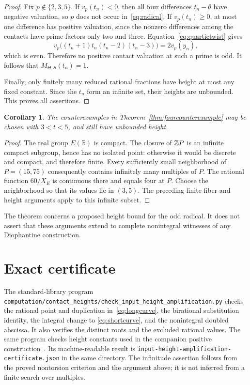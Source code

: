\documentclass[11pt,a4paper]{article}
\newtheorem{corollary}[theorem]{Corollary}
\theoremstyle{definition}\newtheorem{definition}[theorem]{Definition}
\theoremstyle{remark}\newtheorem{remark}[theorem]{Remark}
\newcommand{\R}{\mathbb R}\newcommand{\A}{\mathbb A}
\begin{document}
\begin{proof}
Fix $p\notin\{2,3,5\}$. If $v_p(t_n)<0$, then all four
differences $t_n-\theta$ have negative valuation, so $p$
does not occur in~\eqref{eq:radical}. If $v_p(t_n)\ge0$,
at most one difference has positive valuation, since the
nonzero differences among the contacts have prime factors
only two and three. Equation~\eqref{eq:quartictwist} gives
\[
 v_p\bigl((t_n+1)t_n(t_n-2)(t_n-3)\bigr)=2v_p(y_n),
\]
which is even. Therefore no positive contact valuation at such
a prime is odd. It follows that $M_{\Theta,S}(t_n)=1$.

Finally, only finitely many reduced rational fractions have
height at most any fixed constant. Since the $t_n$ form an
infinite set, their heights are unbounded. This proves all
assertions.
\end{proof}

\begin{corollary}\label{cor:positive}
The counterexamples in Theorem~\ref{thm:fourcounterexample}
may be chosen with $3<t<5$, and still have unbounded height.
\end{corollary}
\begin{proof}
The real group $E(\R)$ is compact. The closure of $\mathbb Z P$
is an infinite compact subgroup, hence has no isolated point:
otherwise it would be discrete and compact, and therefore finite.
Every sufficiently small neighborhood of $P=(15,75)$ consequently
contains infinitely many multiples of $P$. The rational function
$60/X_E$ is continuous there and equals four at $P$.
Choose the neighborhood so that its values lie in $(3,5)$.
The preceding finite-fiber and height arguments apply to this
infinite subset.
\end{proof}

The theorem concerns a proposed height bound for the odd radical.
It does not assert that these arguments extend to complete
nonintegral witnesses of any Diophantine construction.

\section{Exact certificate}

The standard-library program
\nolinkurl{computation/contact_heights/check_input_height_amplification.py}
checks the rational point and duplication in~\eqref{eq:longcurve},
the birational substitution identity, the integral change to
\eqref{eq:shortcurve}, and the nonintegral doubled abscissa.
It also verifies the distinct roots and the excluded rational
values. The same program checks height constants used in the companion
positive construction~\cite{HeightBounds}.
Its machine-readable result is
\nolinkurl{input-height-amplification-certificate.json} in the
same directory. The infinitude assertion follows from the
proved nontorsion criterion and the argument above; it is not
inferred from a finite search over multiples.
\end{document}
